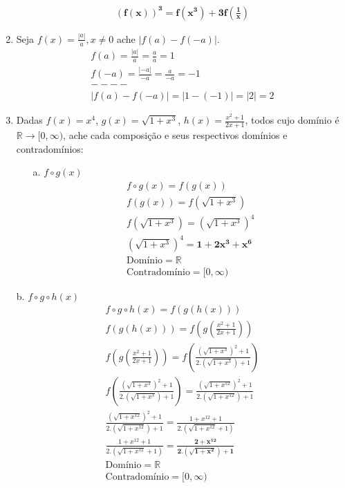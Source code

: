 \documentclass{article}
\begin{document}
\begin{enumerate}
\begin{gather*}
            \mathbf{(f(x))^{3} = f(x^{3})+3f\left(\frac{1}{x}\right)}
        \end{gather*}
    \item Seja $f(x) = \frac{|a|}{a}, x \neq 0$ ache $|f(a)-f(-a)|$.
        \begin{gather*}
            f(a) = \frac{|a|}{a} = \frac{a}{a} = 1 \\
            f(-a) = \frac{|-a|}{-a} = \frac{a}{-a} = -1 \\
            ----\\
            |f(a)-f(-a)| = |1-(-1)| = |2| = 2
        \end{gather*}
    \item Dadas $f(x) = x^{4}$, $g(x) = \sqrt{1+x^{3}}$, $h(x) =
        \frac{x^{2}+1}{2x+1}$, todos cujo domínio é $\mathbb{R} \to [0, \infty)
        $, ache cada composição e seus respectivos domínios e contradomínios:
        \begin{enumerate}
        \item[a.] $f \circ g(x)$
            \begin{gather*}
                f \circ g(x) = f(g(x)) \\
                f(g(x)) = f(\sqrt{1+x^{3}}) \\
                f(\sqrt{1+x^{3}}) = (\sqrt{1+x^{3}})^{4} \\
                (\sqrt{1+x^{3}})^{4} = \mathbf{1+2x^{3}+x^{6}} \\
                \text{Domínio} = \mathbb{R} \\
                \text{Contradomínio} = [0, \infty)
            \end{gather*}
        \end{enumerate}
        \item[b.] $f \circ g \circ h(x)$
            \begin{gather*}
                f \circ g \circ h(x) = f(g(h(x))) \\
                f(g(h(x))) = f\left(g\left(\frac{x^{2}+1}{2x+1}\right)\right) \\
                f\left(g\left(\frac{x^{2}+1}{2x+1}\right)\right) = f\left(\frac{(\sqrt{1+x^{3}})^{2}+1}{2.(\sqrt{1+x^{3}})+1}\right) \\
                f\left(\frac{(\sqrt{1+x^{3}})^{2}+1}{2.(\sqrt{1+x^{3}})+1}\right) = \frac{(\sqrt{1+x^{12}})^{2}+1}{2.(\sqrt{1+x^{12}})+1} \\
                \frac{(\sqrt{1+x^{12}})^{2}+1}{2.(\sqrt{1+x^{12}})+1} = \frac{1+x^{12}+1}{2.(\sqrt{1+x^{12}}+1)} \\
                \frac{1+x^{12}+1}{2.(\sqrt{1+x^{12}}+1)} = \mathbf{\frac{2+x^{12}}{2.(\sqrt{1+x^{2}})+1}} \\
                \text{Domínio} = \mathbb{R} \\
                \text{Contradomínio} = [0, \infty)
            \end{gather*}
\end{enumerate}
\end{document}
